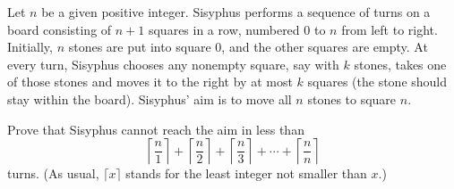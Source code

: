 Let $n$ be a given positive integer. Sisyphus performs a sequence of turns on a board consisting of $n + 1$ squares in a row, numbered $0$ to $n$ from left to right. Initially, $n$ stones are put into square $0$, and the other squares are empty. At every turn, Sisyphus chooses any nonempty square, say with $k$ stones, takes one of those stones and moves it to the right by at most $k$ squares (the stone should stay within the board). Sisyphus' aim is to move all $n$ stones to square $n$.

Prove that Sisyphus cannot reach the aim in less than
\[ \left\lceil \frac{n}{1} \right\rceil + \left\lceil \frac{n}{2} \right\rceil + \left\lceil \frac{n}{3} \right\rceil + \cdots + \left\lceil \frac{n}{n} \right\rceil \]
turns. (As usual, $\lceil x \rceil$ stands for the least integer not smaller than $x$.)
